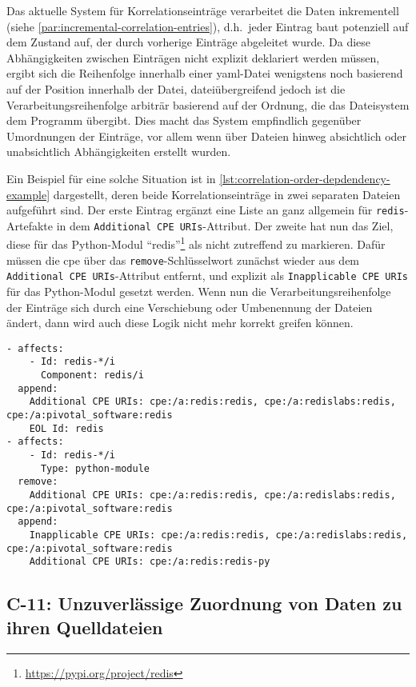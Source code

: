 Das aktuelle System für Korrelationseinträge verarbeitet die Daten inkrementell (siehe \autoref{par:incremental-correlation-entries}), d.h.\ jeder Eintrag baut potenziell auf dem Zustand auf, der durch vorherige Einträge abgeleitet wurde.
Da diese Abhängigkeiten zwischen Einträgen nicht explizit deklariert werden müssen, ergibt sich die Reihenfolge innerhalb einer \acrshort{yaml}-Datei wenigstens noch basierend auf der Position innerhalb der Datei, dateiübergreifend jedoch ist die Verarbeitungsreihenfolge arbiträr basierend auf der Ordnung, die das Dateisystem dem Programm übergibt.
Dies macht das System empfindlich gegenüber Umordnungen der Einträge, vor allem wenn über Dateien hinweg absichtlich oder unabsichtlich Abhängigkeiten erstellt wurden.

Ein Beispiel für eine solche Situation ist in \autoref{lst:correlation-order-depdendency-example} dargestellt, deren beide Korrelationseinträge in zwei separaten Dateien aufgeführt sind.
Der erste Eintrag ergänzt eine Liste an  ganz allgemein für \texttt{redis}-Artefakte in dem \texttt{Additional CPE URIs}-Attribut.
Der zweite hat nun das Ziel, diese für das Python-Modul \enquote{redis}\footnote{\url{https://pypi.org/project/redis}} als nicht zutreffend zu markieren.
Dafür müssen die \acrshort{cpe} über das \texttt{remove}-Schlüsselwort zunächst wieder aus dem \texttt{Additional CPE URIs}-Attribut entfernt, und explizit als \texttt{Inapplicable CPE URIs} für das Python-Modul gesetzt werden.
Wenn nun die Verarbeitungsreihenfolge der Einträge sich durch eine Verschiebung oder Umbenennung der Dateien ändert, dann wird auch diese Logik nicht mehr korrekt greifen können.

\begin{lstlisting}[style=yaml,caption={Zwei aufeinander aufbauende Korrelationseinträge},label={lst:correlation-order-depdendency-example}]
- affects:
    - Id: redis-*/i
      Component: redis/i
  append:
    Additional CPE URIs: cpe:/a:redis:redis, cpe:/a:redislabs:redis, cpe:/a:pivotal_software:redis
    EOL Id: redis
- affects:
    - Id: redis-*/i
      Type: python-module
  remove:
    Additional CPE URIs: cpe:/a:redis:redis, cpe:/a:redislabs:redis, cpe:/a:pivotal_software:redis
  append:
    Inapplicable CPE URIs: cpe:/a:redis:redis, cpe:/a:redislabs:redis, cpe:/a:pivotal_software:redis
    Additional CPE URIs: cpe:/a:redis:redis-py
\end{lstlisting}

\subsection{C-11: Unzuverlässige Zuordnung von Daten zu ihren Quelldateien}\label{subsec:c-11-finding-yaml-entries}

